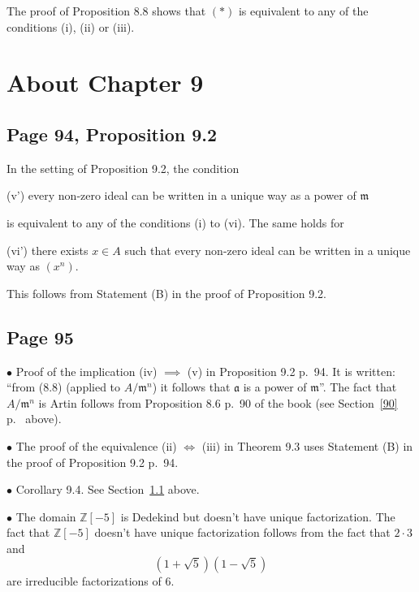 \documentclass[parskip=half,fontsize=12pt]{scrartcl}%
\newcommand{\mf}{\mathfrak}
\newcommand{\bu}{\bullet}
\begin{document}
The proof of Proposition 8.8 shows that $(*)$ is equivalent to any of the conditions (i), (ii) or (iii).

\section{About Chapter 9}%

\subsection{Page 94, Proposition 9.2}\label{92}%

In the setting of Proposition 9.2, the condition

(v') every non-zero ideal can be written in a unique way as a power of $\mf m$

 is equivalent to any of the conditions (i) to (vi). The same holds for

(vi') there exists $x\in A$ such that every non-zero ideal can be written in a unique way as $(x^n)$.

This follows from Statement (B) in the proof of Proposition 9.2.

\subsection{Page 95}%

$\bu$ Proof of the implication (iv) $\implies$ (v) in Proposition 9.2 p.~94. It is written: ``from (8.8) (applied to $A/\mf m^n$) it follows that $\mf a$ is a power of $\mf m$''. The fact that $A/\mf m^n$ is Artin follows from Proposition 8.6 p.~90 of the book (see Section~\ref{90} p.~\pageref{90} above). %

$\bu$ The proof of the equivalence (ii) $\iff$ (iii) in Theorem 9.3 uses Statement (B) in the proof of Proposition 9.2 p.~94.

$\bu$ Corollary 9.4. See Section~\ref{92} above.

$\bu$ The domain $\mathbb Z[-5]$ is Dedekind but doesn't have unique factorization. %
The fact that $\mathbb Z[-5]$ doesn't have unique factorization follows from the fact that $2\cdot3$ and $$\left(1+\sqrt5\right)\left(1-\sqrt5\right)$$ are irreducible factorizations of $6$.%
\end{document}
